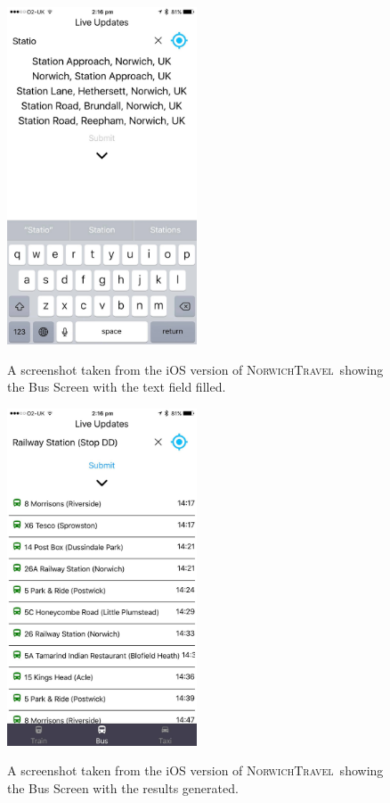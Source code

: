 \documentclass[cmpstyle]{ueacmpstyle}
\newcommand{\nt}{\textsc{NorwichTravel}}
\begin{document}
		\begin{figure}[h]
			\centering
			\includegraphics[height=10cm]{images/ios-bus-1.jpg}\\
			\caption{A screenshot taken from the iOS version of \nt \ showing the Bus Screen with the text field filled.}\label{fig:ios-bus-1}
		\end{figure}
		\begin{figure}[h]
			\centering
			\includegraphics[height=10cm]{images/ios-bus-2.jpg}\\
			\caption{A screenshot taken from the iOS version of \nt \ showing the Bus Screen with the results generated.}\label{fig:ios-bus-2}
		\end{figure}
\end{document}
